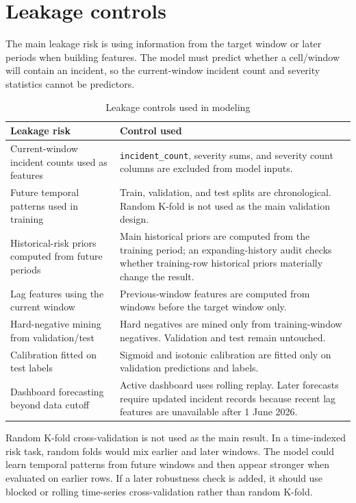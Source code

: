\section{Leakage controls}

The main leakage risk is using information from the target window or later periods when building features. The model must predict whether a cell/window will contain an incident, so the current-window incident count and severity statistics cannot be predictors.

\begin{table}[H]
\centering
\caption{Leakage controls used in modeling}
\label{tab:leakage_controls}
\small
\begin{tabularx}{\textwidth}{L{0.30\textwidth}Y}
\toprule
\textbf{Leakage risk} & \textbf{Control used} \\
\midrule
Current-window incident counts used as features & \texttt{incident\_count}, severity sums, and severity count columns are excluded from model inputs. \\
Future temporal patterns used in training & Train, validation, and test splits are chronological. Random K-fold is not used as the main validation design. \\
Historical-risk priors computed from future periods & Main historical priors are computed from the training period; an expanding-history audit checks whether training-row historical priors materially change the result. \\
Lag features using the current window & Previous-window features are computed from windows before the target window only. \\
Hard-negative mining from validation/test & Hard negatives are mined only from training-window negatives. Validation and test remain untouched. \\
Calibration fitted on test labels & Sigmoid and isotonic calibration are fitted only on validation predictions and labels. \\
Dashboard forecasting beyond data cutoff & Active dashboard uses rolling replay. Later forecasts require updated incident records because recent lag features are unavailable after 1 June 2026. \\
\bottomrule
\end{tabularx}
\end{table}

Random K-fold cross-validation is not used as the main result. In a time-indexed risk task, random folds would mix earlier and later windows. The model could learn temporal patterns from future windows and then appear stronger when evaluated on earlier rows. If a later robustness check is added, it should use blocked or rolling time-series cross-validation rather than random K-fold.

